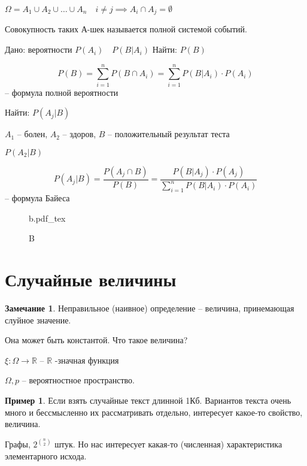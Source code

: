 \documentclass{book}
\newcommand\R{\ensuremath{\mathbb{R}}}
\renewcommand\O{\ensuremath{\emptyset}}
\theoremstyle{definition}
\newtheorem*{note}{Замечание}
\newtheorem*{example}{Пример}
\newcommand{\incfig}[1]{%
    \def\svgwidth{\columnwidth}
    {#1.pdf_tex}
}
\begin{document}
    \begin{definition}
        $ $\\
        $\Omega = A_1\cup A_2\cup \ldots \cup A_n\quad i\neq j\implies A_i\cap A_j = \O $

        Совокупность таких А-шек называется полной системой событий.

        Дано: вероятности $P(A_i)\quad P(B|A_i)$
        Найти: $P(B)$

        \[P(B) = \sum_{i=1}^nP(B\cap A_i) = \sum_{i=1}^n P(B|A_i)\cdot P(A_i)\] -- формула полной вероятности

        Найти: $P\left( A_j|B \right) $

        $A_1$ -- болен, $A_2$ -- здоров, $B$ -- положительный результат теста

        $P(A_2|B)$

        \[P(A_j|B) = \frac{P(A_j\cap B)}{P(B)} = \frac{P(B|A_j)\cdot P(A_j)}{\sum_{i=1}^nP\left( B|A_i \right)\cdot P(A_i) }\] -- формула Байеса
    \end{definition}
\begin{figure}[ht]
    \centering
    \incfig{b}
    \caption{B}
    \label{fig:b}
\end{figure}

\section{Случайные величины}

\begin{note}
    Неправильное (наивное) определение -- величина, принемающая слуйное значение.

    Она может быть константой. Что такое величина?
\end{note}

\begin{definition}

    $\xi: \Omega \to \R$ -- $\R$ -значная функция

    $\Omega, p$ -- вероятностное пространство. 
\end{definition}

\begin{example}
    Если взять случайные текст длинной 1Кб. Вариантов текста очень много и бессмысленно их рассматривать отдельно, интересует какое-то свойство, величина.

    Графы, $2^{n \choose 2}$ штук. Но нас интересует какая-то (численная) характеристика элементарного исхода.
\end{example}
\end{document}
